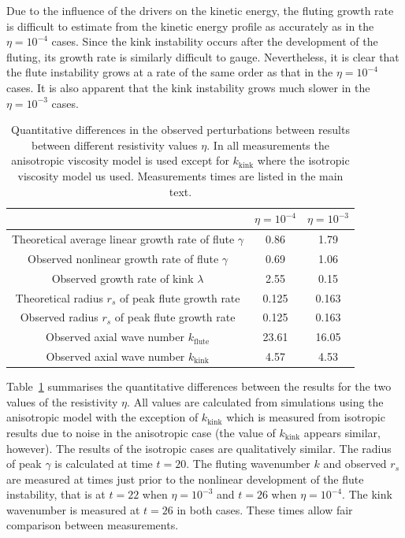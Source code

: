 \documentclass[fleqn,usenatbib]{mnras}
\newcommand{\rs}[2]{{#2}}
\begin{document}
Due to the influence of the drivers on the kinetic energy, the fluting growth rate is difficult to estimate from the kinetic energy profile as accurately as in the $\eta=10^{-4}$ cases. Since the kink instability occurs after the development of the fluting, its growth rate is similarly difficult to gauge. Nevertheless, it is clear that the flute instability grows at a rate of the same order as that in the $\eta=10^{-4}$ cases. It is also apparent that the kink instability grows much slower in the $\eta=10^{-3}$ cases.

\begin{table}
\caption{Quantitative differences in the observed perturbations
  between results \rs{for both values of}{between different
    resistivity values} $\eta$. \rs{}{In all measurements the
  anisotropic viscosity model is used except for $k_\text{kink}$ where the
  isotropic viscosity model us used. Measurements times are listed in
  the main text.}}
\centering
\begin{tabular}{ccc}
&
$\eta=10^{-4}$ &
$\eta=10^{-3}$ \\
\midrule
\rs{Predicted linear}{Theoretical average linear growth rate of flute} $\gamma$ & 0.86 & 1.79  \\
Observed nonlinear \rs{}{growth rate of flute} $\gamma$ & 0.69 & 1.06  \\
Observed \rs{}{growth rate of kink} $\lambda$ & 2.55 & 0.15\\
\midrule
\rs{}{Theoretical} radius $r_s$ of peak \rs{$\gamma$}{flute growth rate} & 0.125 & 0.163 \\
Observed \rs{}{radius} $r_s$ \rs{}{of peak flute growth rate} & 0.125 & 0.163 \\
\midrule
Observed \rs{}{axial wave number} $k_{\rs{flute}{\text{flute}}}$ & 23.61 & 16.05 \\
Observed \rs{}{axial wave number} $k_{\rs{kink}{\text{kink}}}$ & 4.57 & 4.53 \\
\end{tabular}
\label{tab:kink_fluting_params}
\end{table}

Table~\ref{tab:kink_fluting_params} summarises the quantitative
differences between the results for the two values of \rs{}{the
  resistivity} $\eta$. All values are calculated from simulations using the \rs{switching}{anisotropic} model with the exception of $k_{\rs{kink}{\text{kink}}}$ which is measured from isotropic results due to noise in the \rs{switching}{anisotropic} case (the value of $k_{\rs{kink}{\text{kink}}}$ appears similar, however). The results of the isotropic cases are qualitatively similar. The radius of peak $\gamma$ is calculated at time $t=20$. The fluting wavenumber $k$ and observed $r_s$ are measured at times just prior to the nonlinear development of the flute instability, that is at $t=22$ when $\eta=10^{-3}$ and $t=26$ when $\eta = 10^{-4}$. The kink wavenumber is measured at $t=26$ in both cases. These times allow fair comparison between measurements.
\end{document}
